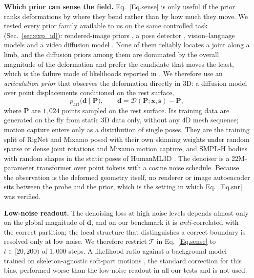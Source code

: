 \documentclass[lettersize,journal]{IEEEtran}
\newenvironment{revblock}{\par\color{red}}{\par}
\begin{document}
\begin{revblock}
\textbf{Which prior can sense the field.} Eq.~\ref{Eq.sense} is only useful if the prior ranks
deformations by where they bend rather than by how much they move. We tested every prior family
available to us on the same controlled task (Sec.~\ref{sec:exp_id}): rendered-image priors
\cite{rombach2022high}, a pose detector \cite{yang2023dwpose}, vision--language models
\cite{qwen3vl2025} and a video diffusion model \cite{wan2025wan}. None of them reliably locates a
joint along a limb, and the diffusion priors among them are dominated by the overall magnitude of
the deformation and prefer the candidate that moves the least, which is the failure mode of
likelihoods reported in \cite{nalisnick2019deep}. We therefore use
an \textit{articulation prior} that observes the deformation directly in 3D: a diffusion model
over point displacements conditioned on the rest surface,
\begin{equation} \label{Eq.artprior}
p_{\text{art}}\big(\bm{d}\mid\bm{P}\big),\qquad
\bm{d}=\mathcal{D}(\bm{P};\bm{x},\bm{s})-\bm{P},
\end{equation}
where $\bm{P}$ are $1{,}024$ points sampled on the rest surface. Its training data are generated
on the fly from static 3D data only, without any 4D mesh sequence; motion capture enters only as
a distribution of single poses. They are the training split of RigNet and
Mixamo posed with their own skinning weights under random sparse or dense joint rotations and
Mixamo motion capture, and SMPL-H bodies \cite{loper2015smpl} with random shapes in the static
poses of HumanML3D \cite{guo2022generating}. The denoiser is a 22M-parameter transformer over
point tokens with a cosine noise schedule. Because the observation is the deformed geometry
itself, no renderer or image autoencoder sits between the probe and the prior, which is the
setting in which Eq.~\ref{Eq.snr} was verified.

\textbf{Low-noise readout.} The denoising loss at high noise levels depends almost only on the
global magnitude of $\bm{d}$, and on our benchmark it is \textit{anti}-correlated with the correct
partition; the local structure that distinguishes a correct boundary is resolved only at low
noise. We therefore restrict $\mathcal{T}$ in Eq.~\ref{Eq.sense} to $t\in[20,200)$ of $1{,}000$
steps. A likelihood ratio against a background model trained on skeleton-agnostic soft-part
motions \cite{ren2019likelihood}, the standard correction for this bias, performed worse than
the low-noise readout in all our tests and is not used.


\end{revblock}
\end{document}
